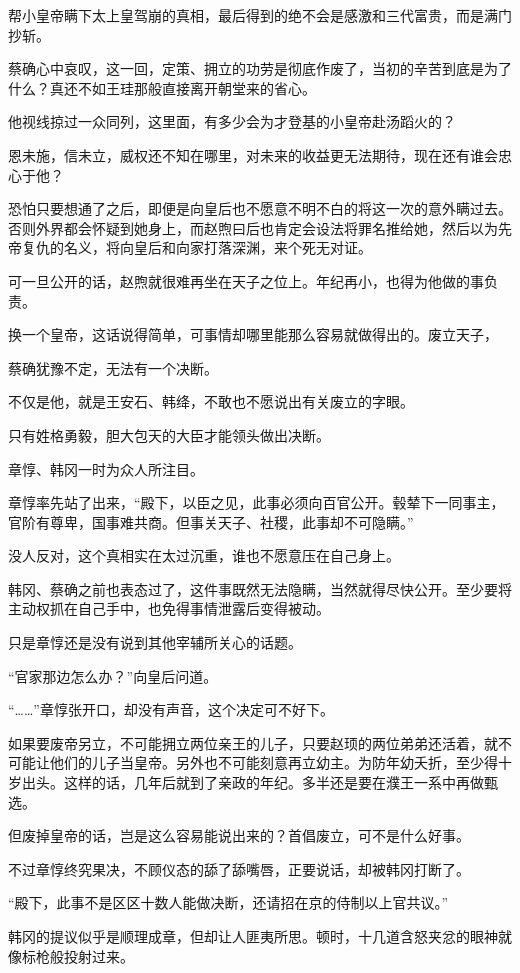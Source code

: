 帮小皇帝瞒下太上皇驾崩的真相，最后得到的绝不会是感激和三代富贵，而是满门抄斩。

蔡确心中哀叹，这一回，定策、拥立的功劳是彻底作废了，当初的辛苦到底是为了什么？真还不如王珪那般直接离开朝堂来的省心。

他视线掠过一众同列，这里面，有多少会为才登基的小皇帝赴汤蹈火的？

恩未施，信未立，威权还不知在哪里，对未来的收益更无法期待，现在还有谁会忠心于他？

恐怕只要想通了之后，即便是向皇后也不愿意不明不白的将这一次的意外瞒过去。否则外界都会怀疑到她身上，而赵煦曰后也肯定会设法将罪名推给她，然后以为先帝复仇的名义，将向皇后和向家打落深渊，来个死无对证。

可一旦公开的话，赵煦就很难再坐在天子之位上。年纪再小，也得为他做的事负责。

换一个皇帝，这话说得简单，可事情却哪里能那么容易就做得出的。废立天子，

蔡确犹豫不定，无法有一个决断。

不仅是他，就是王安石、韩绛，不敢也不愿说出有关废立的字眼。

只有姓格勇毅，胆大包天的大臣才能领头做出决断。

章惇、韩冈一时为众人所注目。

章惇率先站了出来，“殿下，以臣之见，此事必须向百官公开。毂辇下一同事主，官阶有尊卑，国事难共商。但事关天子、社稷，此事却不可隐瞒。”

没人反对，这个真相实在太过沉重，谁也不愿意压在自己身上。

韩冈、蔡确之前也表态过了，这件事既然无法隐瞒，当然就得尽快公开。至少要将主动权抓在自己手中，也免得事情泄露后变得被动。

只是章惇还是没有说到其他宰辅所关心的话题。

“官家那边怎么办？”向皇后问道。

“……”章惇张开口，却没有声音，这个决定可不好下。

如果要废帝另立，不可能拥立两位亲王的儿子，只要赵顼的两位弟弟还活着，就不可能让他们的儿子当皇帝。另外也不可能刻意再立幼主。为防年幼夭折，至少得十岁出头。这样的话，几年后就到了亲政的年纪。多半还是要在濮王一系中再做甄选。

但废掉皇帝的话，岂是这么容易能说出来的？首倡废立，可不是什么好事。

不过章惇终究果决，不顾仪态的舔了舔嘴唇，正要说话，却被韩冈打断了。

“殿下，此事不是区区十数人能做决断，还请招在京的侍制以上官共议。”

韩冈的提议似乎是顺理成章，但却让人匪夷所思。顿时，十几道含怒夹忿的眼神就像标枪般投射过来。

